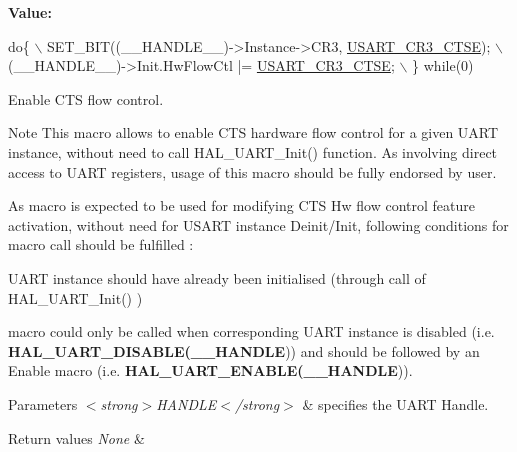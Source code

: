 {\bfseries Value\+:}
\begin{DoxyCode}
\textcolor{keywordflow}{do}\{                                                      \(\backslash\)
    SET\_BIT((\_\_HANDLE\_\_)->Instance->CR3, \hyperlink{group___peripheral___registers___bits___definition_gaa125f026b1ca2d76eab48b191baed265}{USART\_CR3\_CTSE});  \(\backslash\)
    (\_\_HANDLE\_\_)->Init.HwFlowCtl |= \hyperlink{group___peripheral___registers___bits___definition_gaa125f026b1ca2d76eab48b191baed265}{USART\_CR3\_CTSE};        \(\backslash\)
  \} \textcolor{keywordflow}{while}(0)
\end{DoxyCode}


Enable C\+TS flow control. 

\begin{DoxyNote}{Note}
This macro allows to enable C\+TS hardware flow control for a given U\+A\+RT instance, without need to call H\+A\+L\+\_\+\+U\+A\+R\+T\+\_\+\+Init() function. As involving direct access to U\+A\+RT registers, usage of this macro should be fully endorsed by user. 

As macro is expected to be used for modifying C\+TS Hw flow control feature activation, without need for U\+S\+A\+RT instance Deinit/\+Init, following conditions for macro call should be fulfilled \+:
\begin{DoxyItemize}
\item U\+A\+RT instance should have already been initialised (through call of H\+A\+L\+\_\+\+U\+A\+R\+T\+\_\+\+Init() )
\item macro could only be called when corresponding U\+A\+RT instance is disabled (i.\+e. {\bfseries H\+A\+L\+\_\+\+U\+A\+R\+T\+\_\+\+D\+I\+S\+A\+B\+LE(\+\_\+\+\_\+\+H\+A\+N\+D\+LE})) and should be followed by an Enable macro (i.\+e. {\bfseries H\+A\+L\+\_\+\+U\+A\+R\+T\+\_\+\+E\+N\+A\+B\+LE(\+\_\+\+\_\+\+H\+A\+N\+D\+LE})). 
\end{DoxyItemize}
\end{DoxyNote}

\begin{DoxyParams}{Parameters}
{\em $<$strong$>$\+H\+A\+N\+D\+L\+E$<$/strong$>$} & specifies the U\+A\+RT Handle. \\
\hline
\end{DoxyParams}

\begin{DoxyRetVals}{Return values}
{\em None} & \\
\hline
\end{DoxyRetVals}
\mbox{\label{group___u_a_r_t___exported___macros_ga8c034e96ad8f263cafeb5898ff7311fd}} 
